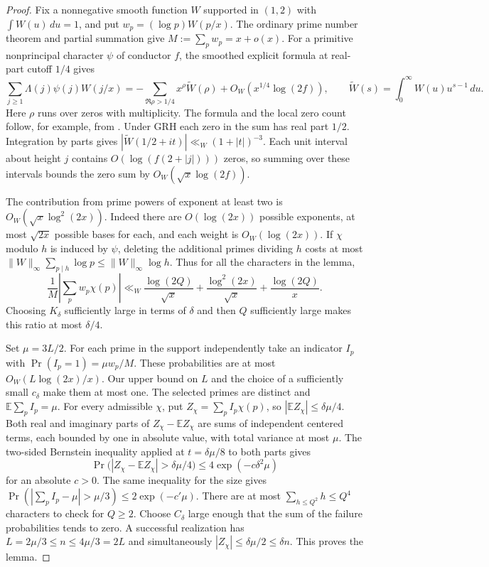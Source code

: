 \documentclass[11pt]{article}
\begin{document}
\begin{proof}
Fix a nonnegative smooth function $W$ supported in $(1,2)$ with
$\int W(u)\,du=1$, and put $w_p=(\log p)W(p/x)$.
The ordinary prime number theorem and partial summation give
$M:=\sum_p w_p=x+o(x)$. For a primitive nonprincipal character $\psi$
of conductor $f$, the smoothed explicit formula at real-part cutoff $1/4$
gives
\[
 \sum_{j\geq1}\Lambda(j)\psi(j)W(j/x)
 =-\sum_{\Re\rho>1/4}x^\rho \widetilde W(\rho)
    +O_W\!\left(x^{1/4}\log(2f)\right),
 \qquad \widetilde W(s)=\int_0^\infty W(u)u^{s-1}\,du.
\]
Here $\rho$ runs over zeros with multiplicity. The formula and the local
zero count follow, for example, from \cite[Exercise 45(i),(v)]{Tao}.
Under GRH each zero in the sum has real part $1/2$. Integration by parts
gives $|\widetilde W(1/2+it)|\ll_W(1+|t|)^{-3}$. Each unit interval
about height $j$ contains $O(\log(f(2+|j|)))$ zeros, so summing over
these intervals bounds the zero sum by $O_W(\sqrt{x}\log(2f))$.

The contribution from prime powers of exponent at least two is
$O_W(\sqrt{x}\log^2(2x))$. Indeed there are $O(\log(2x))$ possible
exponents, at most $\sqrt{2x}$ possible bases for each, and each weight
is $O_W(\log(2x))$. If $\chi$ modulo $h$ is induced by $\psi$, deleting
the additional primes dividing $h$ costs at most
$\|W\|_\infty\sum_{p\mid h}\log p\leq\|W\|_\infty\log h$.
Thus for all the characters in the lemma,
\[
 \frac1M\left|\sum_p w_p\chi(p)\right|
 \ll_W \frac{\log(2Q)}{\sqrt{x}}+
          \frac{\log^2(2x)}{\sqrt{x}}+
          \frac{\log(2Q)}{x}.
\]
Choosing $K_\delta$ sufficiently large in terms of $\delta$ and then $Q$
sufficiently large makes this ratio at most $\delta/4$.

Set $\mu=3L/2$. For each prime in the support independently take an
indicator $I_p$ with $\Pr(I_p=1)=\mu w_p/M$. These probabilities are
at most $O_W(L\log(2x)/x)$. Our upper bound on $L$ and the choice of a
sufficiently small $c_\delta$ make them at most one. The selected primes
are distinct and $\mathbb E\sum_p I_p=\mu$. For every admissible $\chi$, put
$Z_\chi=\sum_p I_p\chi(p)$, so $|\mathbb E Z_\chi|\leq\delta\mu/4$.
Both real and imaginary parts of $Z_\chi-\mathbb E Z_\chi$ are sums of
independent centered terms, each bounded by one in absolute value, with
total variance at most $\mu$. The two-sided Bernstein inequality applied
at $t=\delta\mu/8$ to both parts gives
\[
 \Pr\bigl(|Z_\chi-\mathbb E Z_\chi|>\delta\mu/4\bigr)
 \leq 4\exp(-c\delta^2\mu)
\]
for an absolute $c>0$. The same inequality for the size gives
$\Pr(|\sum_p I_p-\mu|>\mu/3)\leq 2\exp(-c'\mu)$.
There are at most $\sum_{h\leq Q^2}h\leq Q^4$ characters to check
for $Q\geq2$. Choose $C_\delta$ large enough that the sum of the
failure probabilities tends to zero. A successful realization has
$L=2\mu/3\leq n\leq 4\mu/3=2L$ and simultaneously
$|Z_\chi|\leq\delta\mu/2\leq\delta n$. This proves the lemma.
\end{proof}
\end{document}
